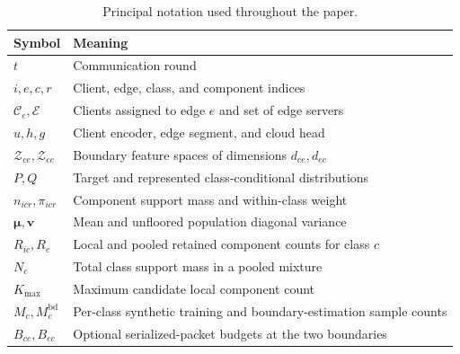 \begin{table}[t]
\caption{Principal notation used throughout the paper.}
\label{tab:notation}
\centering
\small
\begin{tabularx}{\columnwidth}{@{}lX@{}}
\toprule
Symbol & Meaning\\
\midrule
$t$ & Communication round\\
$i,e,c,r$ & Client, edge, class, and component indices\\
$\mathcal C_e,\mathcal E$ & Clients assigned to edge $e$ and set of edge servers\\
$u,h,g$ & Client encoder, edge segment, and cloud head\\
$\mathcal Z_{ce},\mathcal Z_{ec}$ & Boundary feature spaces of dimensions $d_{ce},d_{ec}$\\
$P,Q$ & Target and represented class-conditional distributions\\
$n_{icr},\pi_{icr}$ & Component support mass and within-class weight\\
$\bm\mu,\bm v$ & Mean and unfloored population diagonal variance\\
$R_{ic},R_c$ & Local and pooled retained component counts for class $c$\\
$N_c$ & Total class support mass in a pooled mixture\\
$K_{\max}$ & Maximum candidate local component count\\
$M_c,M_c^{\mathrm{bd}}$ & Per-class synthetic training and boundary-estimation sample counts\\
$B_{ce},B_{ec}$ & Optional serialized-packet budgets at the two boundaries\\
\bottomrule
\end{tabularx}
\end{table}